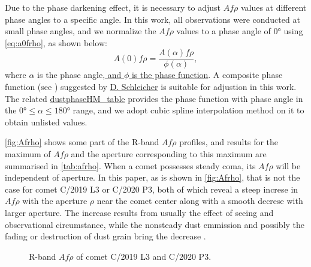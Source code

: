 Due to the phase darkening effect, it is necessary to adjust $Af\rho$ values at different phase angles to a specific angle. In this work, all observations were conducted at small phase angles, and we normalize the $Af\rho$ values to a phase angle of \ang{0} using \autoref{eq:a0frho}, as shown below:
\begin{equation}
    A(0)f\rho = \frac{A(\alpha)f\rho}{\phi(\alpha)}, \label{eq:a0frho}
\end{equation}
where $\alpha$ is the phase angle\ul{, and $\phi$ is the phase function}. A composite phase function (see \citealt{schleicher_composition_2011, marcus_forward-scattering_2007}) suggested by {\href{https://asteroid.lowell.edu/comet/dustphase.html}{D. Schleicher}} is suitable for adjustion in this work. The related {\href{https://asteroid.lowell.edu/comet/dustphaseHM_table.html}{dustphaseHM\_table}} provides the phase function with phase angle in the $\ang{0} \leqslant \alpha \leqslant \ang{180}$ range, and we adopt cubic spline interpolation method on it to obtain unlisted values. 

\autoref{fig:Afrho} shows some part of the R-band $Af\rho$ profiles, and results for the maximum of $Af\rho$ and the aperture corresponding to this maximum are summarised in \autoref{tab:afrho}. When a comet possesses steady coma, its $Af\rho$ will be independent of aperture. In this paper, as is shown in \autoref{fig:Afrho}, that is not the case for comet C/2019 L3 or C/2020 P3, both of which reveal a steep increse in $Af\rho$ with the aperture $\rho$ near the comet center along with a smooth decrese with larger aperture. The increase results from usually the effect of seeing and observational circumstance, while the nonsteady dust emmission and possibly the fading or destruction of dust grain bring the decrease \citep{lara_behaviour_2003,tozzi_imaging_2003}.  
             


\begin{figure}[!htbp]
    \centering

    \caption{R-band $Af\rho$ of comet C/2019 L3 and C/2020 P3. }
    \label{fig:Afrho}
\end{figure}

